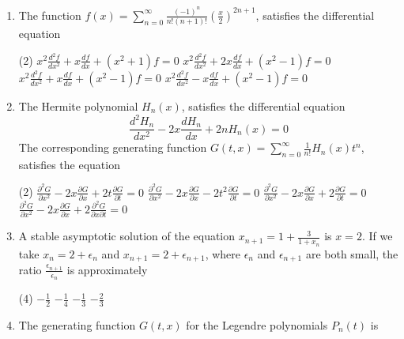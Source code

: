\begin{enumerate}[label=\color{ocre}\textbf{\arabic*.}]
	{}
	\begin{tasks}(4)
		\task[\textbf{A.}] $0.26$
		\task[\textbf{C.}] $0.5$
		\task[\textbf{D.}] $-1$
	\end{tasks}
	\item The function $f(x)=\sum_{n=0}^{\infty} \frac{(-1)^{n}}{n !(n+1) !}\left(\frac{x}{2}\right)^{2 n+1}$, satisfies the differential equation
	{}
	\begin{tasks}(2)
		\task[\textbf{A.}]  $x^{2} \frac{d^{2} f}{d x^{2}}+x \frac{d f}{d x}+\left(x^{2}+1\right) f=0$
		\task[\textbf{B.}]  $x^{2} \frac{d^{2} f}{d x^{2}}+2 x \frac{d f}{d x}+\left(x^{2}-1\right) f=0$
		\task[\textbf{C.}] $x^{2} \frac{d^{2} f}{d x^{2}}+x \frac{d f}{d x}+\left(x^{2}-1\right) f=0$
		\task[\textbf{D.}] $x^{2} \frac{d^{2} f}{d x^{2}}-x \frac{d f}{d x}+\left(x^{2}-1\right) f=0$
	\end{tasks}
	\item
	 The Hermite polynomial $H_{n}(x)$, satisfies the differential equation
	$$
	\frac{d^{2} H_{n}}{d x^{2}}-2 x \frac{d H_{n}}{d x}+2 n H_{n}(x)=0
	$$
	The corresponding generating function $G(t, x)=\sum_{n=0}^{\infty} \frac{1}{n !} H_{n}(x) t^{n}$, satisfies the equation
	{}
	\begin{tasks}(2)
		\task[\textbf{A.}] $\frac{\partial^{2} G}{\partial x^{2}}-2 x \frac{\partial G}{\partial x}+2 t \frac{\partial G}{\partial t}=0$
		\task[\textbf{B.}] $\frac{\partial^{2} G}{\partial x^{2}}-2 x \frac{\partial G}{\partial x}-2 t^{2} \frac{\partial G}{\partial t}=0$
		\task[\textbf{C.}] $\frac{\partial^{2} G}{\partial x^{2}}-2 x \frac{\partial G}{\partial x}+2 \frac{\partial G}{\partial t}=0$
		\task[\textbf{D.}]  $\frac{\partial^{2} G}{\partial x^{2}}-2 x \frac{\partial G}{\partial x}+2 \frac{\partial^{2} G}{\partial x \partial t}=0$
	\end{tasks}
	\item A stable asymptotic solution of the equation $x_{n+1}=1+\frac{3}{1+x_{n}}$ is $x=2$. If we take $x_{n}=2+\epsilon_{n}$ and $x_{n+1}=2+\epsilon_{n+1}$, where $\epsilon_{n}$ and $\epsilon_{n+1}$ are both small, the ratio $\frac{\epsilon_{n+1}}{\epsilon_{n}}$ is approximately
	{}
	\begin{tasks}(4)
		\task[\textbf{A.}] $-\frac{1}{2}$
		\task[\textbf{B.}] $-\frac{1}{4}$
		\task[\textbf{C.}]  $-\frac{1}{3}$
		\task[\textbf{D.}] $-\frac{2}{3}$
	\end{tasks}
\item  The generating function $G(t, x)$ for the Legendre polynomials $P_{n}(t)$ is

\end{enumerate}
